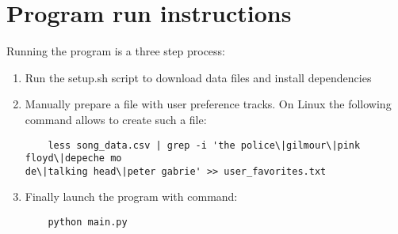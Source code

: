 \documentclass{article}
\numberwithin{equation}{section}		%
\numberwithin{figure}{section}			%
\numberwithin{table}{section}				%
\begin{document}
\section{Program run instructions}
Running the program is a three step process:
\begin{enumerate}
\item Run the setup.sh script to download data files and install dependencies
\item Manually prepare a file with user preference tracks. On Linux the following command allows to create such a file:
\begin{lstlisting}
	less song_data.csv | grep -i 'the police\|gilmour\|pink floyd\|depeche mo
de\|talking head\|peter gabrie' >> user_favorites.txt
\end{lstlisting}
\item Finally launch the program with command:
\begin{lstlisting}
	python main.py
\end{lstlisting}
\end{enumerate}




\end{document}

